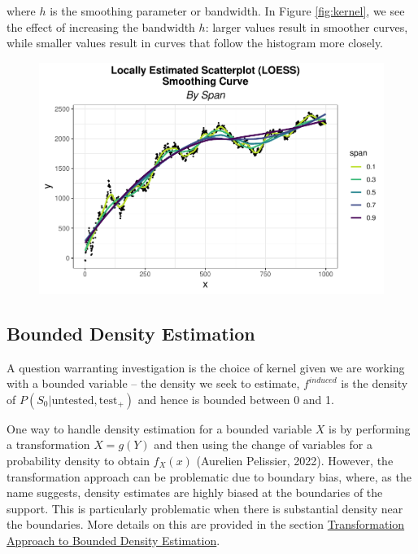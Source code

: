 \documentclass[12pt,twoside]{smiththesis}
\begin{document}
where \(h\) is the smoothing parameter or bandwidth. In Figure \ref{fig:kernel}, we see the effect of increasing the bandwidth \(h\): larger values result in smoother curves, while smaller values result in curves that follow the histogram more closely.
\begin{figure}

{\centering \includegraphics[width=1\linewidth]{thesis_files/figure-latex/unnamed-chunk-32-1} 

}

\caption{\label{fig:kernel}}\label{fig:unnamed-chunk-32}
\end{figure}
\hypertarget{bounded-density-estimation}{%
\subsection{Bounded Density Estimation}\label{bounded-density-estimation}}

A question warranting investigation is the choice of kernel given we are working with a bounded variable -- the density we seek to estimate, \(f^{induced}\) is the density of \(P(S_0|\text{untested}, \text{test}_+)\) and hence is bounded between 0 and 1.

One way to handle density estimation for a bounded variable \(X\) is by performing a transformation
\(X=g(Y)\) and then using the change of variables for a probability density to obtain \(f_X(x)\) (Aurelien Pelissier, 2022). However, the transformation approach can be problematic due to boundary bias, where, as the name suggests, density estimates are highly biased at the boundaries of the support. This is particularly problematic when there is substantial density near the boundaries. More details on this are provided in the section \protect\hyperlink{bounded-density-transform}{Transformation Approach to Bounded Density Estimation}.
\end{document}
